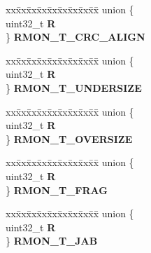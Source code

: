 \begin{DoxyCompactItemize}
\begin{tabbing}
\end{tabbing}\item 
\mbox{\label{structFEC__tag_af97857ba66ef51da29955a179e5a6a5c}} 
\begin{tabbing}
xx\=xx\=xx\=xx\=xx\=xx\=xx\=xx\=xx\=\kill
union \{\\
\>uint32\_t {\bfseries R}\\
\} {\bfseries RMON\_T\_CRC\_ALIGN}\\

\end{tabbing}\item 
\mbox{\label{structFEC__tag_acc43f96eb8543064371b2cb5d04aaaac}} 
\begin{tabbing}
xx\=xx\=xx\=xx\=xx\=xx\=xx\=xx\=xx\=\kill
union \{\\
\>uint32\_t {\bfseries R}\\
\} {\bfseries RMON\_T\_UNDERSIZE}\\

\end{tabbing}\item 
\mbox{\label{structFEC__tag_a3bdf97ee17c53b31e13eb6a92e09d8bb}} 
\begin{tabbing}
xx\=xx\=xx\=xx\=xx\=xx\=xx\=xx\=xx\=\kill
union \{\\
\>uint32\_t {\bfseries R}\\
\} {\bfseries RMON\_T\_OVERSIZE}\\

\end{tabbing}\item 
\mbox{\label{structFEC__tag_ae36e8e001bb722ec96bc53f80ad501df}} 
\begin{tabbing}
xx\=xx\=xx\=xx\=xx\=xx\=xx\=xx\=xx\=\kill
union \{\\
\>uint32\_t {\bfseries R}\\
\} {\bfseries RMON\_T\_FRAG}\\

\end{tabbing}\item 
\mbox{\label{structFEC__tag_a0c30d8b7484cf0400dd2da3fb6d73a9e}} 
\begin{tabbing}
xx\=xx\=xx\=xx\=xx\=xx\=xx\=xx\=xx\=\kill
union \{\\
\>uint32\_t {\bfseries R}\\
\} {\bfseries RMON\_T\_JAB}\\


\end{tabbing}
\end{DoxyCompactItemize}
